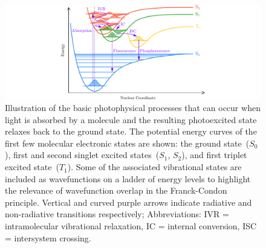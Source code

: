 \begin{figure}[t!]
  \centering
  \includegraphics[width = \textwidth]{Figures/fig_ch2_photophysics.pdf}
  \caption[Illustration of the basic photophysical processes
  that can occur when light is absorbed by a molecule
  and the resulting photoexcited state relaxes back to the ground state.]{
  Illustration of the basic photophysical processes that can occur when light is
  absorbed by a molecule and the resulting photoexcited state relaxes back to the ground state.
  The potential energy curves of the first few molecular electronic states are shown:
  the ground state~($S_0$), first and second singlet excited states~($S_1$, $S_2$),
  and first triplet excited state~($T_1$).
  Some of the associated vibrational states are included as wavefunctions
  on a ladder of energy levels to highlight the relevance of wavefunction overlap
  in the Franck-Condon principle.
  Vertical and curved purple arrows indicate radiative and non-radiative transitions respectively;
  Abbreviations: IVR = intramolecular vibrational relaxation, IC = internal conversion,
  ISC = intersystem crossing.
  }
  \label{fig: photophysics}
\end{figure}

